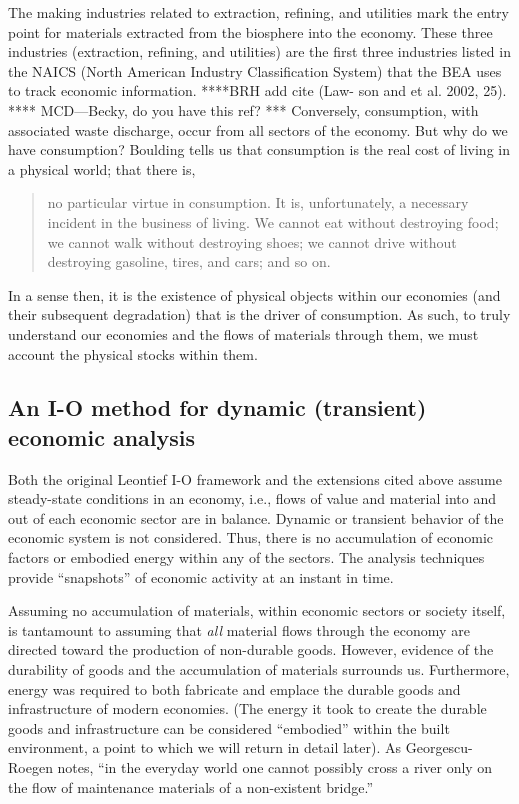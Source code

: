 The making industries related to extraction, 
refining, and utilities mark the entry point for 
materials extracted from the biosphere into the economy. 
These three industries (extraction, refining, and utilities) 
are the first three industries listed in the 
NAICS (North American Industry Classification System) 
that the BEA uses to track economic information. 
****BRH add cite (Law- son and et al. 2002, 25). ****
MCD---Becky, do you have this ref? ***
Conversely, consumption, with associated waste
discharge, occur from all sectors of the economy.
But why do we have consumption?
Boulding tells us that consumption is the 
real cost of living in a physical world;
that there is,
\begin{quotation}
no particular virtue in consumption. 
It is, unfortunately, 
a necessary incident in the business of living. 
We cannot eat without destroying food; 
we cannot walk without destroying shoes; 
we cannot drive without destroying gasoline, 
tires, and cars; and so on.\cite[p.2]{Boulding1945}
\end{quotation}
In a sense then,
it is the existence of physical objects within our economies
(and their subsequent degradation)
that is the driver of consumption.
As such,
to truly understand our economies and the 
flows of materials through them,
we must account the physical stocks within them.


\subsection{An I-O method for dynamic (transient) economic analysis}
\label{sec:IO_dynamic}

Both the original Leontief I-O framework 
and the extensions cited above 
assume steady-state conditions in an economy, 
i.e., flows of value and material into 
and out of each economic sector are in balance. 
Dynamic or transient behavior 
of the economic system is not considered. 
Thus, there is no accumulation of economic factors 
or embodied energy within any of the sectors. 
The analysis techniques provide ``snapshots'' 
of economic activity at an instant in time.

Assuming no accumulation of materials, 
within economic sectors or society itself, 
is tantamount to assuming that \emph{all} material flows 
through the economy are directed toward 
the production of non-durable goods. 
However, evidence of the durability of goods 
and the accumulation of materials surrounds us. 
Furthermore, 
energy was required to both fabricate and emplace 
the durable goods and infrastructure of modern economies. 
(The energy it took to create the durable goods and infrastructure 
can be considered ``embodied'' within the built environment, 
a point to which we will return in detail later). 
As Georgescu-Roegen notes, 
``in the everyday world one cannot possibly cross a river 
only on the flow of maintenance materials 
of a non-existent bridge.''~\cite{G-R1975}

